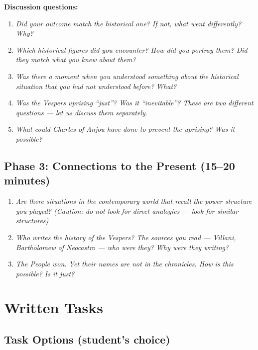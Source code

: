 \textbf{Discussion questions:}

\begin{enumerate}
  \item \textit{Did your outcome match the historical one? If not,
    what went differently? Why?}

  \item \textit{Which historical figures did you encounter? How did
    you portray them? Did they match what you knew about them?}

  \item \textit{Was there a moment when you understood something about
    the historical situation that you had not understood before? What?}

  \item \textit{Was the Vespers uprising ``just''? Was it ``inevitable''?
    These are two different questions --- let us discuss them separately.}

  \item \textit{What could Charles of Anjou have done to prevent the
    uprising? Was it possible?}
\end{enumerate}

\subsection{Phase 3: Connections to the Present (15--20 minutes)}

\begin{enumerate}
  \item \textit{Are there situations in the contemporary world that
    recall the power structure you played? (Caution: do not look for
    direct analogies --- look for similar structures)}

  \item \textit{Who writes the history of the Vespers? The sources you
    read --- Villani, Bartholomew of Neocastro --- who were they?
    Why were they writing?}

  \item \textit{The People won. Yet their names are not in the chronicles.
    How is this possible? Is it just?}
\end{enumerate}

\secsep

\section{Written Tasks}

\subsection{Task Options (student's choice)}

